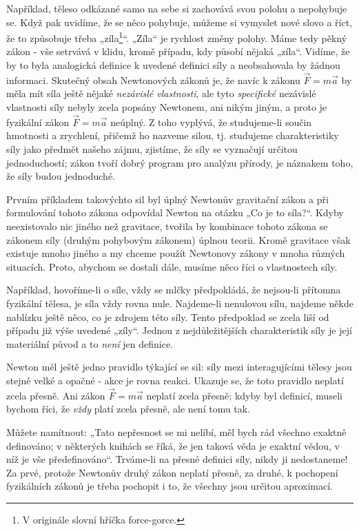 {    Například, těleso odkázané samo na sebe si zachovává svou polohu a nepohybuje se. Když pak 
    uvidíme, že se něco pohybuje, můžeme si vymyslet nové slovo a říct, že to způsobuje třeba 
    „zíla\footnote{V originále slovní hříčka force-gorce.}“. „Zíla“ je rychlost změny polohy. Máme 
    tedy pěkný zákon - vše setrvává v klidu, kromě případu, kdy působí nějaká „zíla“. Vidíme, že by 
    to byla analogická definice k uvedené definici síly a neobsahovala by žádnou informaci. 
    Skutečný obsah Newtonových zákonů je, že navíc k zákonu \(\vec{F}= m\vec{a}\) by měla mít síla 
    ještě nějaké \emph{nezávislé vlastnosti}, ale tyto \emph{specifické} nezávislé vlastnosti síly 
    nebyly zcela popsány Newtonem, ani nikým jiným, a proto je fyzikální zákon \(\vec{F}= 
    m\vec{a}\) neúplný. Z toho vyplývá, že studujeme-li součin hmotnosti a zrychlení, přičemž ho 
    nazveme silou, tj. studujeme charakteristiky síly jako předmět našeho zájmu, zjistíme, že síly 
    se vyznačují určitou jednoduchostí; zákon tvoří dobrý program pro analýzu přírody, je náznakem 
    toho, že síly budou jednoduché.
    
    Prvním příkladem takovýchto sil byl úplný Newtonův gravitační zákon a při formulování tohoto 
    zákona odpovídal Newton na otázku „Co je to síla?“. Kdyby neexistovalo nic jiného než 
    gravitace, tvořila by kombinace tohoto zákona se zákonem síly (druhým pohybovým zákonem) úplnou 
    teorii. Kromě gravitace však existuje mnoho jiného a my chceme použít Newtonovy zákony v mnoha 
    různých situacích. Proto, abychom se dostali dále, musíme něco říci o vlastnostech síly.
    
    Například, hovoříme-li o síle, vždy se mlčky předpokládá, že nejsou-li přítomna fyzikální 
    tělesa, je síla vždy rovna nule. Najdeme-li nenulovou sílu, najdeme někde nablízku ještě něco, 
    co je zdrojem této síly. Tento předpoklad se zcela liší od případu již výše uvedené „zíly“. 
    Jednou z nejdůležitějších charakteristik síly je její materiální původ a to \emph{není} jen 
    definice.
    
    Newton měl ještě jedno pravidlo týkající se sil: síly mezi interagujícími tělesy jsou stejně 
    velké a opačné - akce je rovna reakci. Ukazuje se, že toto pravidlo neplatí zcela přesně. Ani 
    zákon \(\vec{F}= m\vec{a}\) neplatí zcela přesně; kdyby byl definicí, museli bychom říci, že 
    \emph{vždy} platí zcela přesně, ale není tomu tak.
    
    Můžete namítnout: „Tato nepřesnost se mi nelíbí, měl bych rád všechno exaktně definováno; v 
    některých knihách se říká, že jen taková věda je exaktní vědou, v níž je vše předefinováno“. 
    Trváme-li na přesné definici síly, nikdy ji nedostaneme! Za prvé, protože Newtonův druhý zákon 
    neplatí přesně, za druhé, k pochopení fyzikálních zákonů je třeba pochopit i to, že všechny 
    jsou určitou aproximací.
    
}
